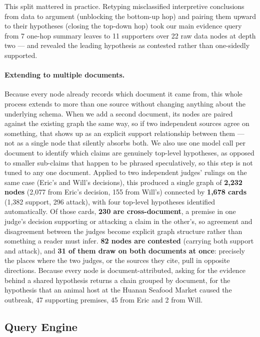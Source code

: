 \documentclass{article}
\begin{document}
This split mattered in practice. Retyping misclassified interpretive conclusions
from data to argument (unblocking the bottom-up hop) and pairing them upward to
their hypotheses (closing the top-down hop) took our main evidence query from 7
one-hop summary leaves to 11 supporters over 22 raw data nodes at depth two ---
and revealed the leading hypothesis as contested rather than one-sidedly
supported.

\paragraph{Extending to multiple documents.}
Because every node already records which document it came from, this whole
process extends to more than one source without changing anything about the
underlying schema. When we add a second document, its nodes are paired against
the existing graph the same way, so if two independent sources agree on
something, that shows up as an explicit support relationship between them ---
not as a single node that silently absorbs both. We also use one model call per
document to identify which claims are genuinely top-level hypotheses, as opposed
to smaller sub-claims that happen to be phrased speculatively, so this step is
not tuned to any one document. Applied to two independent judges' rulings on the
same case (Eric's and Will's decisions), this produced a single graph of
\textbf{2{,}232 nodes} (2{,}077 from Eric's decision, 155 from Will's) connected
by \textbf{1{,}678 cards} (1{,}382 support, 296 attack), with four top-level
hypotheses identified automatically. Of those cards, \textbf{230 are
cross-document}, a premise in one judge's decision supporting or attacking a
claim in the other's, so agreement and disagreement between the judges become
explicit graph structure rather than something a reader must infer. \textbf{82
nodes are contested} (carrying both support and attack), and \textbf{31 of them
draw on both documents at once}: precisely the places where the two judges, or
the sources they cite, pull in opposite directions. Because every node is
document-attributed, asking for the evidence behind a shared hypothesis returns a
chain grouped by document, for the hypothesis that an animal host at the Huanan
Seafood Market caused the outbreak, 47 supporting premises, 45 from Eric and 2
from Will.


\subsection{Query Engine}
\end{document}

